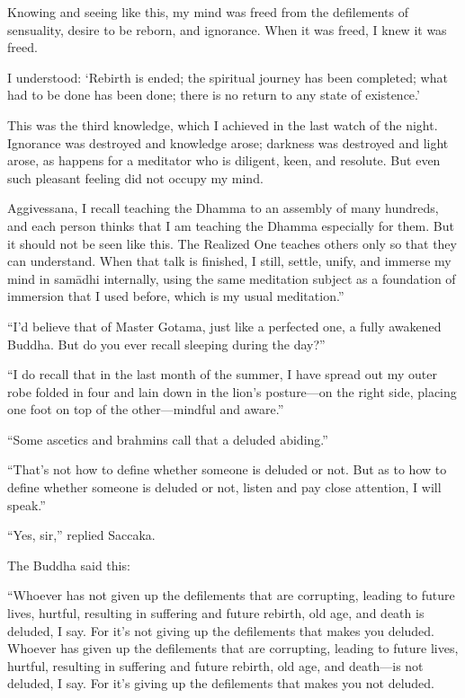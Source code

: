 \documentclass[12pt,openany]{book}%
\begin{document}
Knowing and seeing like this, my mind was freed from the defilements of sensuality, desire to be reborn, and ignorance. When it was freed, I knew it was freed. 

I understood: ‘Rebirth is ended; the spiritual journey has been completed; what had to be done has been done; there is no return to any state of existence.’ 

This was the third knowledge, which I achieved in the last watch of the night. Ignorance was destroyed and knowledge arose; darkness was destroyed and light arose, as happens for a meditator who is diligent, keen, and resolute. But even such pleasant feeling did not occupy my mind. 

Aggivessana, I recall teaching the Dhamma to an assembly of many hundreds, and each person thinks that I am teaching the Dhamma especially for them. But it should not be seen like this. The Realized One teaches others only so that they can understand. When that talk is finished, I still, settle, unify, and immerse my mind in \textsanskrit{samādhi} internally, using the same meditation subject as a foundation of immersion that I used before, which is my usual meditation.” 

“I’d believe that of Master Gotama, just like a perfected one, a fully awakened Buddha. But do you ever recall sleeping during the day?” 

“I do recall that in the last month of the summer, I have spread out my outer robe folded in four and lain down in the lion’s posture—on the right side, placing one foot on top of the other—mindful and aware.” 

“Some ascetics and brahmins call that a deluded abiding.” 

“That’s not how to define whether someone is deluded or not. But as to how to define whether someone is deluded or not, listen and pay close attention, I will speak.” 

“Yes, sir,” replied Saccaka. 

The Buddha said this: 

“Whoever has not given up the defilements that are corrupting, leading to future lives, hurtful, resulting in suffering and future rebirth, old age, and death is deluded, I say. For it’s not giving up the defilements that makes you deluded. Whoever has given up the defilements that are corrupting, leading to future lives, hurtful, resulting in suffering and future rebirth, old age, and death—is not deluded, I say. For it’s giving up the defilements that makes you not deluded. 
\end{document}
